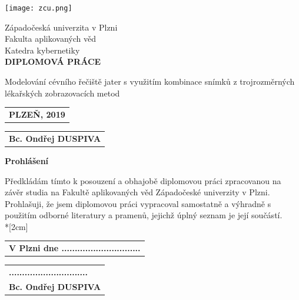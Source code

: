 \documentclass{thesis}%
\begin{document}
%
\sloppy %
\begin{titlepage}
    \begin{center}
        \vspace*{0.6cm}
        

        
        \texttt{[image: zcu.png]}
        
        Západočeská univerzita v Plzni\\
        Fakulta aplikovaných věd\\       
        Katedra kybernetiky\\

        \vspace{4 cm}
     \textbf{DIPLOMOVÁ PRÁCE}
        
        \vspace{0.5cm}
       Modelování cévního řečiště jater s využitím kombinace snímků z trojrozměrných lékařských zobrazovacích metod
        
        \vspace{6cm}
   \end{center}    

\begin{tabular}[t]{@{}l} 
 \textbf{PLZEŇ, 2019}
\end{tabular}
\hfill%
\begin{tabular}[t]{l@{}}
   \textbf{Bc. Ondřej DUSPIVA}
\end{tabular}
        
        \vfill
\end{titlepage}
\thispagestyle{empty}
\textbf{Prohlášení}

\vspace{0.6cm}

Předkládám tímto k posouzení a obhajobě diplomovou práci zpracovanou na závěr
studia na Fakultě aplikovaných věd Západočeské univerzity v Plzni.\\
Prohlašuji, že jsem diplomovou práci vypracoval samostatně a výhradně s použitím
odborné literatury a pramenů, jejichž úplný seznam je její součástí.\\*[2cm]

\begin{tabular}[t]{@{}l} 
 \textbf{V Plzni dne ..............................}
\end{tabular}
\hfill%
\begin{tabular}[t]{l@{}}
    \textbf{..............................}\\
   \textbf{Bc. Ondřej DUSPIVA}
\end{tabular}
\newpage 
\end{document}
